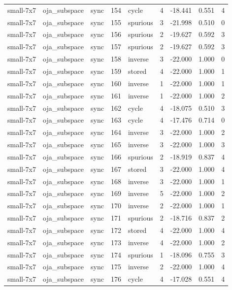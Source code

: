 \begin{tabular}{lllrlrrrr}
small-7x7 & oja\_subspace & sync & 154 & cycle & 4 & -18.441 & 0.551 & 4 \\
small-7x7 & oja\_subspace & sync & 155 & spurious & 3 & -21.998 & 0.510 & 0 \\
small-7x7 & oja\_subspace & sync & 156 & spurious & 2 & -19.627 & 0.592 & 3 \\
small-7x7 & oja\_subspace & sync & 157 & spurious & 2 & -19.627 & 0.592 & 3 \\
small-7x7 & oja\_subspace & sync & 158 & inverse & 3 & -22.000 & 1.000 & 0 \\
small-7x7 & oja\_subspace & sync & 159 & stored & 4 & -22.000 & 1.000 & 1 \\
small-7x7 & oja\_subspace & sync & 160 & inverse & 1 & -22.000 & 1.000 & 1 \\
small-7x7 & oja\_subspace & sync & 161 & inverse & 1 & -22.000 & 1.000 & 2 \\
small-7x7 & oja\_subspace & sync & 162 & cycle & 4 & -18.075 & 0.510 & 3 \\
small-7x7 & oja\_subspace & sync & 163 & cycle & 4 & -17.476 & 0.714 & 0 \\
small-7x7 & oja\_subspace & sync & 164 & inverse & 3 & -22.000 & 1.000 & 2 \\
small-7x7 & oja\_subspace & sync & 165 & inverse & 3 & -22.000 & 1.000 & 3 \\
small-7x7 & oja\_subspace & sync & 166 & spurious & 2 & -18.919 & 0.837 & 4 \\
small-7x7 & oja\_subspace & sync & 167 & stored & 3 & -22.000 & 1.000 & 4 \\
small-7x7 & oja\_subspace & sync & 168 & inverse & 3 & -22.000 & 1.000 & 1 \\
small-7x7 & oja\_subspace & sync & 169 & inverse & 5 & -22.000 & 1.000 & 2 \\
small-7x7 & oja\_subspace & sync & 170 & inverse & 2 & -22.000 & 1.000 & 1 \\
small-7x7 & oja\_subspace & sync & 171 & spurious & 2 & -18.716 & 0.837 & 2 \\
small-7x7 & oja\_subspace & sync & 172 & stored & 4 & -22.000 & 1.000 & 4 \\
small-7x7 & oja\_subspace & sync & 173 & inverse & 4 & -22.000 & 1.000 & 2 \\
small-7x7 & oja\_subspace & sync & 174 & spurious & 1 & -18.096 & 0.755 & 3 \\
small-7x7 & oja\_subspace & sync & 175 & inverse & 2 & -22.000 & 1.000 & 4 \\
small-7x7 & oja\_subspace & sync & 176 & cycle & 4 & -17.028 & 0.551 & 4 \\

\end{tabular}
